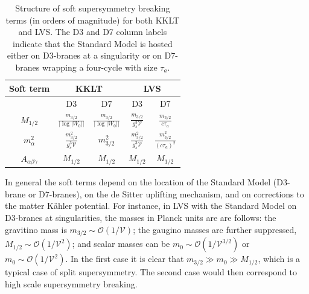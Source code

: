 \documentclass[12pt,a4wide]{article}
\def\O{\mathcal{O}}
\def\V{\mathcal{V}}
\begin{document}
\begingroup

\setlength{\tabcolsep}{10pt} 
\renewcommand{\arraystretch}{1.5}  
\begin{table}[h!]
\begin{center}
\centering
\begin{tabular}{ | c || c | c || c | c |}
\hline
 \rowcolor{lightgray!}  {\bf Soft term} &   \multicolumn{2}{c||}{\bf KKLT} &   \multicolumn{2}{c|}{\bf LVS} \\
 \hline
 \hline
 & D3 & D7 & D3 & D7 \\
 \hline \hline
 $M_{1/2}$ & $\frac{m_{3/2}}{\left | \log |W_0| \right |} $ & $\frac{m_{3/2}}{\left | \log |W_0| \right |} $ & $\frac{m_{3/2}}{g_s^3\V}$ & $\frac{m_{3/2}}{c\tau_a}$ \\  \hline
 $m_\alpha^2$ & $\frac{m_{3/2}^2}{g_s^3\V}$ & $m_{3/2}^2$ & $\frac{m_{3/2}^2}{g_s^3\V}$ & $\frac{m_{3/2}^2}{\left(c\tau_a\right)^2}$ \\  \hline
 $A_{\alpha\beta\gamma}$ & $M_{1/2}$ & $M_{1/2}$ & $M_{1/2}$ & $M_{1/2}$ \\  \hline
\end{tabular}
\end{center} 
\caption {Structure of soft supersymmetry breaking terms (in orders of magnitude) for both KKLT  and LVS.  The D3 and D7 column labels indicate that the  Standard Model is hosted either on D3-branes at a singularity or on D7-branes wrapping a four-cycle with size $\tau_a$.} 
\label{tab:soft}
\end{table}
\endgroup

In general the soft terms depend on the location of the Standard Model (D3-brane or D7-branes), on the de Sitter uplifting mechanism, and on corrections to the matter K\"ahler potential. For instance, in LVS with the Standard Model on D3-branes at singularities, 
the masses in Planck units are are follows: the gravitino mass is
$m_{3/2}\sim \O(1/\V)$; the gaugino masses are further suppressed, $M_{1/2}\sim \O(1/\V^{2})$; and scalar masses can be
$m_0\sim \O(1/\V^{3/2})$ or $m_0\sim \O(1/\V^{2})$. In the first case it is clear that $m_{3/2}\gg m_0 \gg M_{1/2}$, which is a typical case of split supersymmetry. The second case would then correspond to high scale supersymmetry breaking.
\end{document}
